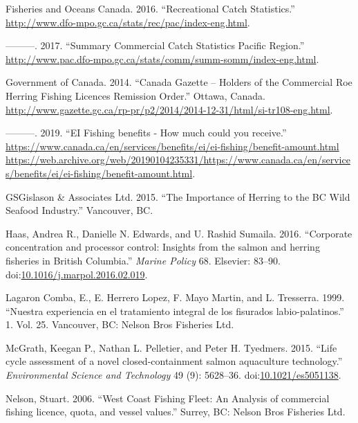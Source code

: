 \documentclass[]{article}
\theoremstyle{definition}
\theoremstyle{definition}
\theoremstyle{definition}
\theoremstyle{remark}
\begin{document}
\hypertarget{ref-FisheriesandOceansCanada2016a}{}
Fisheries and Oceans Canada. 2016. ``Recreational Catch Statistics.''
\url{http://www.dfo-mpo.gc.ca/stats/rec/pac/index-eng.html}.

\hypertarget{ref-FisheriesandOceansCanada2017a}{}
---------. 2017. ``Summary Commercial Catch Statistics \textbar{}
Pacific Region.''
\url{http://www.pac.dfo-mpo.gc.ca/stats/comm/summ-somm/index-eng.html}.

\hypertarget{ref-GovernmentofCanada2014}{}
Government of Canada. 2014. ``Canada Gazette -- Holders of the
Commercial Roe Herring Fishing Licences Remission Order.'' Ottawa,
Canada.
\url{http://www.gazette.gc.ca/rp-pr/p2/2014/2014-12-31/html/si-tr108-eng.html}.

\hypertarget{ref-GovernmentofCanada2019}{}
---------. 2019. ``EI Fishing benefits - How much could you receive.''
\href{https://www.canada.ca/en/services/benefits/ei/ei-fishing/benefit-amount.html\%20https://web.archive.org/web/20190104235331/https://www.canada.ca/en/services/benefits/ei/ei-fishing/benefit-amount.html}{https://www.canada.ca/en/services/benefits/ei/ei-fishing/benefit-amount.html https://web.archive.org/web/20190104235331/https://www.canada.ca/en/services/benefits/ei/ei-fishing/benefit-amount.html}.

\hypertarget{ref-SeafoodProducersAssociationofBC2015a}{}
GSGislason \& Associates Ltd. 2015. ``The Importance of Herring to the
BC Wild Seafood Industry.'' Vancouver, BC.

\hypertarget{ref-Haas2016}{}
Haas, Andrea R., Danielle N. Edwards, and U. Rashid Sumaila. 2016.
``Corporate concentration and processor control: Insights from the
salmon and herring fisheries in British Columbia.'' \emph{Marine Policy}
68. Elsevier: 83--90.
doi:\href{https://doi.org/10.1016/j.marpol.2016.02.019}{10.1016/j.marpol.2016.02.019}.

\hypertarget{ref-Nelson2011}{}
Lagaron Comba, E., E. Herrero Lopez, F. Mayo Martin, and L. Tresserra.
1999. ``Nuestra experiencia en el tratamiento integral de los fisurados
labio-palatinos.'' 1. Vol. 25. Vancouver, BC: Nelson Bros Fisheries Ltd.

\hypertarget{ref-McGrath2015a}{}
McGrath, Keegan P., Nathan L. Pelletier, and Peter H. Tyedmers. 2015.
``Life cycle assessment of a novel closed-containment salmon aquaculture
technology.'' \emph{Environmental Science and Technology} 49 (9):
5628--36.
doi:\href{https://doi.org/10.1021/es5051138}{10.1021/es5051138}.

\hypertarget{ref-Nelson2006}{}
Nelson, Stuart. 2006. ``West Coast Fishing Fleet: An Analysis of
commercial fishing licence, quota, and vessel values.'' Surrey, BC:
Nelson Bros Fisheries Ltd.
\end{document}
